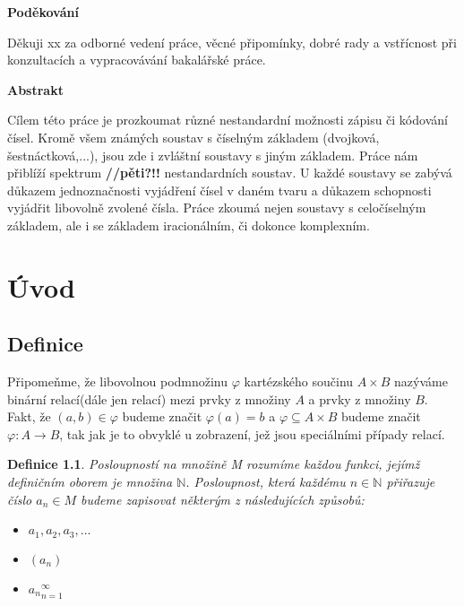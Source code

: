 \documentclass[12pt]{book}
\newtheorem{definice}{Definice}
\begin{document}
\newpage

\begin{center}
	\textbf{Poděkování}

Děkuji xx za odborné vedení práce, věcné připomínky, dobré rady a vstřícnost při
konzultacích a vypracovávání bakalářské práce.
\end{center}

\newpage

\textbf{Abstrakt}

Cílem této práce je prozkoumat různé nestandardní možnosti zápisu či kódování čísel. Kromě všem známých soustav s číselným základem (dvojková, šestnáctková,...), jsou zde i zvláštní soustavy s jiným základem. Práce nám přiblíží spektrum \textbf{//pěti?!!} nestandardních soustav. U každé soustavy se zabývá důkazem jednoznačnosti vyjádření čísel v daném tvaru a důkazem schopnosti vyjádřit libovolně zvolené čísla. Práce zkoumá nejen soustavy s celočíselným základem, ale i se základem iracionálním, či dokonce komplexním.

\newpage

\tableofcontents

\newpage

\chapter{Úvod}
\section{Definice}

\newcommand{\poslbeta}{\{\beta_i\}_{i=1}^{\infty}}
\newcommand{\poslalpha}{\{\alpha_i\}_{i=0}^{\infty}}
\newcommand{\posla}{\{a_i\}_{i=0}^{\infty}}
\newcommand{\poslb}{\{b_i\}_{i=1}^{\infty}}

Připomeňme, že libovolnou podmnožinu $\varphi$ kartézského součinu $A \times B$ nazýváme binární relací(dále jen relací) mezi prvky z množiny $A$ a prvky z množiny $B$. Fakt, že $(a,b)\in \varphi$ budeme značit $\varphi(a) = b$ a $\varphi \subseteq A \times B$ budeme značit $\varphi : A \rightarrow B$, tak jak je to obvyklé u zobrazení, jež jsou speciálními případy relací.


\begin{definice}
	Posloupností na množině M rozumíme každou funkci, jejímž definičním oborem je množina $\mathbb{N}$. Posloupnost, která každému $n \in \mathbb{N}$ přiřazuje číslo $a_n \in M$ budeme zapisovat některým z následujících způsobů:
	\begin{itemize}
		\item $a_1, a_2, a_3, ...$
		\item $(a_n)$
		\item ${a_n}_{n=1}^{\infty}$
	\end{itemize}
\end{definice}
\end{document}
